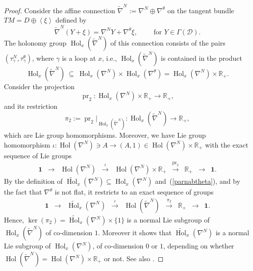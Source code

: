 \documentclass{amsart}
\theoremstyle{plain}
\theoremstyle{definition}
\newcommand{\Hol}{\operatorname{Hol}}
\newcommand{\pr}{\operatorname{pr}}
\newcommand{\Real}{\mathbb{R}}
\newcommand{\1}{\mathbf{1}}
\newcommand{\D}{{\mathcal D}}
\newcommand{\+}{\oplus}
\newcommand{\N}{N}
\newcommand{\tnab}{\widetilde{\nabla}}
\newcommand{\acom}[1]{
 \marginpar{{\scriptsize A: #1 }}}
\begin{document}
\begin{proof} 
Consider the affine connection $\tnab^N:=\nabla^{N}\oplus\nabla^\theta$ on the tangent bundle $TM=D\oplus\left<\xi\right>$ defined by
$$\tnab^N(Y+\xi)=\nabla^{N}Y+\nabla^\theta\xi,\qquad \text{ for }Y\in\Gamma(\D).$$ The holonomy group 
${\Hol}_x(\tnab^\N)$ of this connection consists of the pairs $(\tau^N_\gamma,\tau^\theta_\gamma)$, where $\gamma$ is a loop at $x$, i.e., ${\Hol}_x(\tnab^\N)$ is contained in the product 
\[{\Hol}_x(\tnab^\N)\ \subseteq\ {\Hol}_x(\nabla^N)\times {\Hol}_x(\nabla^\theta)={\Hol}_x(\nabla^N)\times \Real_{+}.\] 
Consider the projection
$$\pr_2:  {\Hol}_x(\nabla^N)\times \Real_+\longrightarrow \Real_+,$$
and its restriction
$$\pi_2:=\pr_2|_{{\Hol}_x(\tnab^\N)}:  {\Hol}_x(\tnab^\N)\longrightarrow \Real_+,$$
which are  Lie group homomorphisms.   Moreover, we have  Lie group homomorphism $\iota:\Hol(\nabla^N)\ni A\to (A,1)\in \Hol(\nabla^N)\times \Real_{+}$ with the exact sequence of Lie groups 
\[\begin{array}{ccccccccccc}
\1&\longrightarrow& \Hol(\nabla^N)&\stackrel{\iota}{\longrightarrow} & \Hol(\nabla^N) \times \Real_+ &\stackrel{\pr_2}{\longrightarrow}& \Real_+ &\longrightarrow&\1.
\end{array}
\]
By the definition of $\widetilde{\Hol}_x(\nabla^N)\subseteq \Hol_x(\nabla^N) $ and~(\ref{parnabtheta}), and by the fact that $\nabla^\theta$ is not flat,  it restricts to an exact sequence of groups
\[\begin{array}{ccccccccccc}
\1&\longrightarrow&\widetilde{\Hol}_x(\nabla^N) &\stackrel{\iota}{\longrightarrow} & \Hol(\tnab^N) &\stackrel{\pi_2}{\longrightarrow}& \Real_+ &\longrightarrow&\1.
\end{array}
\]
Hence, $\ker (\pi_2)= \widetilde{\Hol}_x(\nabla^N) \times \{1\}$ is a normal Lie subgroup of ${\Hol}_x(\tnab^\N)$ of  co-dimension $1$.
Moreover it shows 
 that $\widetilde{\Hol}_x(\nabla^N)$ is a
normal Lie subgroup of 
$ {\Hol}_x(\nabla^\N)$, of co-dimension $0$ or $1$, depending on whether $\Hol(\tnab^N)= \Hol(\nabla^N) \times \Real_+ $ or not.
See also  \cite[Th. 5]{GalHolK}.



\end{proof}
\end{document}
